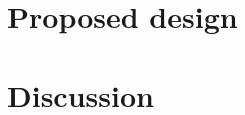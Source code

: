 \section{Proposed design}                       \label{Chapter:PMLSM design HM/proposed design}


\section{Discussion}                            \label{Chapter:PMLSM design HM/discussion}